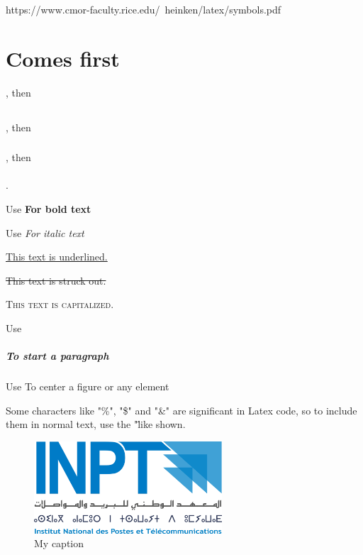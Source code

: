 


https://www.cmor-faculty.rice.edu/~heinken/latex/symbols.pdf


\chapter{Comes first}, then \section{}, then \subsection{}, then \subsubsection{}.


Use \textbf{For bold text}

Use \textit{For italic text}

\underline{This text is underlined.}

\st{This text is struck out.}

\textsc{This text is capitalized.}

Use \paragraph{To start a paragraph}

Use \centering To center a figure or any element

Some characters like "\%", "\$" and "\&" are significant in Latex code, so to include them in normal text, use the "\" like shown.






\begin{figure}[H] 
    \centering
    \includegraphics[width=7cm]{Logos/Logo_INPT.png}
    \caption{My caption}
\end{figure}

